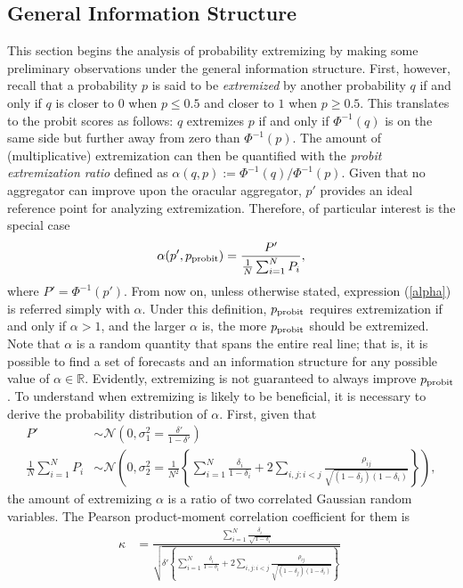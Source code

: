\documentclass[11pt]{article}
\theoremstyle{definition}
\theoremstyle{definition}
\def\probit{p_{\rm probit}}
\begin{document}
\subsection{General Information Structure}
This section begins the analysis of probability extremizing by making some preliminary observations under the general information structure. First, however, recall that a probability $p$ is said to be \textit{extremized} by another probability $q$ if and only
if $q$ is closer to $0$ when $p \leq 0.5$ and closer to $1$ when $p
\geq 0.5$. This translates to the probit scores as follows: $q$ extremizes $p$ if and only if  $\Phi^{-1}(q)$ is on the same side but further away from zero than $\Phi^{-1}(p)$. The amount of (multiplicative) extremization can then be quantified with the {\em probit extremization ratio} defined as 
 $\alpha(q,p) := \Phi^{-1}(q) / \Phi^{-1} (p)$. Given that no aggregator can improve upon the oracular aggregator, $p'$ provides an ideal
reference point for analyzing extremization. Therefore, of particular interest is the special case
\begin{align}
\alpha(p', \probit)  = \frac{P'}{\frac{1}{N}\sum_{i=1}^N P_{i}}, \label{alpha}
\end{align}
where $P' = \Phi^{-1}(p')$. From now on, unless otherwise stated, expression (\ref{alpha}) is referred simply with
$\alpha$. 
Under this definition, $\probit$
requires extremization if and only if $\alpha > 1$, and the larger $\alpha$ is, the more $\probit$ should be extremized. Note that $\alpha$ is a random quantity that spans the entire real line;
that is, it is possible to find a set of forecasts and an information structure for any possible value of $\alpha \in
\mathbb{R}$.  Evidently, extremizing is not guaranteed to always
improve $\probit$.  To understand when extremizing is
likely to be beneficial, it is necessary to derive the probability
distribution of $\alpha$.  First, given that
\begin{align*}
P' &\sim \mathcal{N}\left(0, \sigma^2_{1} = 
  \frac{\delta'}{1-\delta'} \right)\\ \frac{1}{N}\sum_{i=1}^N P_{i} 
&\sim \mathcal{N}\left(0, \sigma^2_{2} =\frac{1}{N^2} 
  \left\{ \sum_{i=1}^N \frac{\delta_i}{1-\delta_i} 
  + 2 \sum_{i,j: i<j} \frac{\rho_{ij}}{\sqrt{(1-\delta_j)(1-\delta_i)}}
  \right\} \right),
\end{align*}
the amount of extremizing $\alpha$ is a ratio of two correlated
Gaussian random variables.  The Pearson product-moment correlation
coefficient for them is
\begin{align*}
\kappa  &= 
  \frac{ \sum_{i=1}^N \frac{\delta_i}{\sqrt{1-\delta_i}}}
  {\sqrt{\delta'  \left\{ \sum_{i=1}^N \frac{\delta_i}{1-\delta_i} + 2 
  \sum_{i,j: i<j} \frac{\rho_{ij}}{\sqrt{(1-\delta_j)(1-\delta_i)}}\right\}}}
  \; 
\end{align*}
\end{document}
